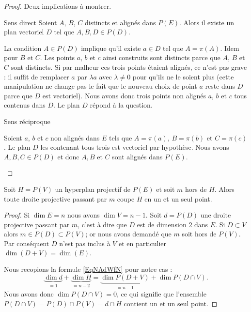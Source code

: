 \begin{proof}
    Deux implications à montrer.
    \begin{subproof}
        \item[Sens direct]
            Soient \( A\), \( B\), \( C\) distincts et alignés dans \( P(E)\). Alors il existe un plan vectoriel \( D\) tel que \( A,B,D\in P(D)\). 
            
            La condition \( A\in P(D)\) implique qu'il existe \( a\in D\) tel que \( A=\pi(A)\). Idem pour \( B\) et \( C\). Les points \( a\), \( b\) et \( c\) ainsi construits sont distincts parce que \( A\), \( B\) et \( C\) sont distincts. Si par malheur ces trois points étaient alignés, ce n'est pas grave : il suffit de remplacer \( a\) par \( \lambda a\) avec \( \lambda\neq 0\) pour qu'ils ne le soient plus (cette manipulation ne change pas le fait que le nouveau choix de point \( a\) reste dans \( D\) parce que \( D\) est vectoriel). Nous avons donc trois points non alignés \( a\), \( b\) et \( c\) tous contenus dans \( D\). Le plan \( D\) répond à la question.

        \item[Sens réciproque]

            Soient \( a\), \( b\) et \( c\) non alignés dans \( E\) tels que \( A=\pi(a)\), \( B=\pi(b)\) et \( C=\pi(c)\). Le plan \( D\) les contenant tous trois est vectoriel par hypothèse. Nous avons \( A,B,C\in P(D)\) et donc \( A,B\) et $C$ sont alignés dans \( P(E)\).
    \end{subproof}
\end{proof}

\begin{proposition}
    Soit \( H=P(V)\) un hyperplan projectif de \( P(E)\) et soit \( m\) hors de \( H\). Alors toute droite projective passant par \( m\) coupe \( H\) en un et un seul point.
\end{proposition}

\begin{proof}
    Si \( \dim E=n\) nous avons \( \dim V=n-1\). Soit \( d=P(D)\) une droite projective passant par \( m\), c'est à dire que \( D\) est de dimension \( 2\) dans \( E\). Si \( D\subset V\) alors \( m\in P(D)\subset P(V)\); or nous avons demandé que \( m\) soit hors de \( P(V)\). Par conséquent \( D\) n'est pas inclus à \( V\) et en particulier \( \dim(D+V)=\dim(E)\).

    Nous recopions la formule \eqref{EqNAdWfN} pour notre cas :
    \begin{equation}
        \underbrace{\dim d}_{=1}+\underbrace{\dim H}_{=n-2}=\underbrace{\dim P(D+V)}_{=n-1}+\dim P(D\cap V).
    \end{equation}
    Nous avons donc \( \dim P(D\cap V)=0\), ce qui signifie que l'ensemble \( P(D\cap V)=P(D)\cap P(V)=d\cap H\) contient un et un seul point.
\end{proof}

